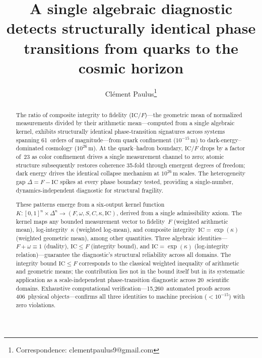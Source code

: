 \documentclass[11pt]{article}
\newcommand{\IC}{\mathrm{IC}}
\begin{document}
\title{A single algebraic diagnostic detects structurally identical
phase transitions from quarks to the cosmic horizon}

\author{Cl\'{e}ment Paulus\thanks{Correspondence: clementpaulus9@gmail.com}}

\date{}

\newcommand{\keywords}{Phase transitions, cross-scale universality,
quark confinement, information geometry, coherence, computational
verification}

\begin{abstract}
The ratio of composite integrity to fidelity ($\IC/F$)---the
geometric mean of normalized measurements divided by their
arithmetic mean---computed from a single algebraic kernel,
exhibits structurally identical phase-transition signatures
across systems spanning 61~orders of magnitude---from quark
confinement ($10^{-15}$\,m) to dark-energy--dominated cosmology
($10^{26}$\,m). At the quark--hadron
boundary, $\IC/F$ drops by a factor of~23 as color confinement
drives a single measurement channel to zero; atomic structure
subsequently restores coherence 35-fold through emergent degrees of
freedom; dark energy drives the identical collapse mechanism at
$10^{26}$\,m scales. The heterogeneity gap $\Delta = F - \IC$ spikes
at every phase boundary tested, providing a single-number,
dynamics-independent diagnostic for structural fragility.

These patterns emerge from a six-output kernel function
$K\!:\![0,1]^n \times \Delta^n \to (F, \omega, S, C,
\kappa, \IC)$, derived from a single admissibility axiom. The kernel
maps any bounded measurement vector to fidelity~$F$ (weighted
arithmetic mean), log-integrity~$\kappa$ (weighted log-mean), and
composite integrity~$\IC = \exp(\kappa)$ (weighted geometric mean),
among other quantities. Three algebraic identities---$F + \omega
\equiv 1$ (duality), $\IC \leq F$ (integrity bound), and
$\IC = \exp(\kappa)$ (log-integrity relation)---guarantee the
diagnostic's structural reliability across all domains. The integrity
bound $\IC \leq F$ corresponds to the classical weighted inequality
of arithmetic and geometric means; the contribution lies not in the
bound itself but in its systematic application as a scale-independent
phase-transition diagnostic across 20~scientific domains. Exhaustive
computational verification---15{,}260~automated proofs across
406~physical objects---confirms all three identities to machine
precision ($<\!10^{-15}$) with zero violations.
\end{abstract}
\end{document}
